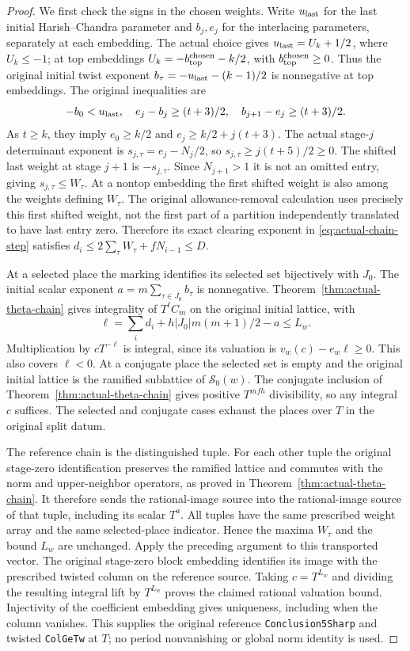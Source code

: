 \begin{proof}
We first check the signs in the chosen weights. Write $u_{\rm last}$
for the last initial Harish--Chandra parameter and $b_j,e_j$ for
the interlacing parameters, separately at each embedding. The actual
choice gives $u_{\rm last}=U_k+1/2$, where $U_k\le-1$; at top embeddings
$U_k=-b_{\rm top}^{\rm chosen}-k/2$, with
$b_{\rm top}^{\rm chosen}\ge0$. Thus the original initial twist exponent
$b_\tau=-u_{\rm last}-(k-1)/2$ is nonnegative at top embeddings.
The original inequalities are
\[
 -b_0<u_{\rm last},\quad
 e_j-b_j\ge(t+3)/2,\quad
 b_{j+1}-e_j\ge(t+3)/2.
\]
As $t\ge k$, they imply $e_0\ge k/2$ and
$e_j\ge k/2+j(t+3)$. The actual stage-$j$ determinant exponent is
$s_{j,\tau}=e_j-N_j/2$, so $s_{j,\tau}\ge j(t+5)/2\ge0$.
The shifted last weight at stage $j+1$ is $-s_{j,\tau}$.
Since $N_{j+1}>1$ it is not an omitted entry, giving
$s_{j,\tau}\le W_\tau$. At a nontop embedding the first shifted
weight is also among the weights defining $W_\tau$.
The original allowance-removal calculation uses precisely this first
shifted weight, not the first part of a partition independently
translated to have last entry zero. Therefore its exact clearing
exponent in \eqref{eq:actual-chain-step} satisfies
$d_i\le2\sum_\tau W_\tau+fN_{i-1}\le D$.

At a selected place the marking identifies its selected set bijectively
with $J_0$. The initial scalar exponent
$a=m\sum_{\tau\in J_0}b_\tau$ is nonnegative.
Theorem~\ref{thm:actual-theta-chain} gives integrality of
$T^\ell C_m$ on the original initial lattice, with
\[
 \ell=\sum_i d_i+h|J_0|m(m+1)/2-a\le L_w.
\]
Multiplication by $cT^{-\ell}$ is integral, since its valuation is
$v_w(c)-e_w\ell\ge0$. This also covers $\ell<0$.
At a conjugate place the selected set is empty and the original
initial lattice is the ramified sublattice of $\mathscr S_0(w)$.
The conjugate inclusion of Theorem~\ref{thm:actual-theta-chain}
gives positive $T^{mfh}$ divisibility, so any integral $c$ suffices.
The selected and conjugate cases exhaust the places over $T$ in
the original split datum.

The reference chain is the distinguished tuple. For each other tuple
the original stage-zero identification preserves the ramified lattice
and commutes with the norm and upper-neighbor operators, as proved
in Theorem~\ref{thm:actual-theta-chain}. It therefore sends the
rational-image source into the rational-image source of that tuple,
including its scalar $T^a$. All tuples have the same prescribed weight
array and the same selected-place indicator. Hence the maxima
$W_\tau$ and the bound $L_w$ are unchanged. Apply the preceding
argument to this transported vector. The original stage-zero block
embedding identifies its image with the prescribed twisted column
on the reference source. Taking $c=T^{L_w}$ and dividing the resulting
integral lift by $T^{L_w}$ proves the claimed rational valuation bound.
Injectivity of the coefficient embedding gives uniqueness, including
when the column vanishes. This supplies the original reference
\texttt{Conclusion5Sharp} and twisted \texttt{ColGeTw} at $T$;
no period nonvanishing or global norm identity is used.
\end{proof}

